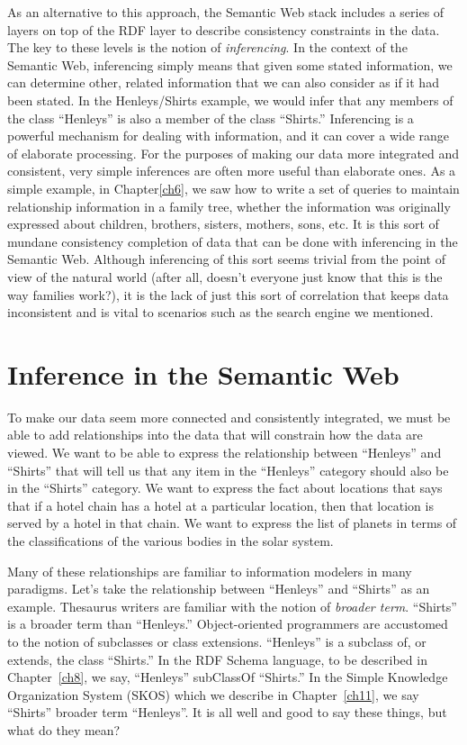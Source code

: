 As an alternative to this approach, the Semantic Web stack includes a
series of layers on top of the RDF layer to describe consistency
constraints in the data. The key to these levels is the notion of
\emph{inferencing}. In the context of the Semantic Web, inferencing
simply means that given some stated information, we can determine other,
related information that we can also consider as if it had been stated.
In the Henleys/Shirts example, we would infer that any members of the
class ``Henleys'' is also a member of the class ``Shirts.'' Inferencing
is a powerful mechanism for dealing with information, and it can cover a
wide range of elaborate processing. For the purposes of making our data
more integrated and consistent, very simple inferences are often more
useful than elaborate ones. As a simple example, in Chapter\ref{ch6}, we saw
how to write a set of queries to maintain relationship information in a
family tree, whether the information was originally expressed about
children, brothers, sisters, mothers, sons, etc. It is this sort of
mundane consistency completion of data that can be done with inferencing
in the Semantic Web. Although inferencing of this sort seems trivial
from the point of view of the natural world (after all, doesn't everyone
just know that this is the way families work?), it is the lack of just
this sort of correlation that keeps data inconsistent and is vital to
scenarios such as the search engine we mentioned.

\section{Inference in the Semantic Web}

To make our data seem more connected and consistently integrated, we
must be able to add relationships into the data that will constrain how
the data are viewed. We want to be able to express the relationship
between ``Henleys'' and ``Shirts'' that will tell us that any item in
the ``Henleys'' category should also be in the ``Shirts'' category. We
want to express the fact about locations that says that if a hotel chain
has a hotel at a particular location, then that location is served by a
hotel in that chain. We want to express the list of planets in terms of
the classifications of the various bodies in the solar system.

Many of these relationships are familiar to information modelers in many
paradigms. Let's take the relationship between ``Henleys'' and
``Shirts'' as an example. Thesaurus writers are familiar with the notion
of \emph{broader term}. ``Shirts'' is a broader term than ``Henleys.''
Object-oriented programmers are accustomed to the notion of subclasses
or class extensions. ``Henleys'' is a subclass of, or extends, the class
``Shirts.'' In the RDF Schema language, to be described in Chapter~\ref{ch8}, we say, ``Henleys'' subClassOf ``Shirts.''  
In the Simple Knowledge Organization System (SKOS) which we describe in Chapter~\ref{ch11}, we say ``Shirts'' broader term ``Henleys''. 
It is all well and
good to say these things, but what do they mean?

